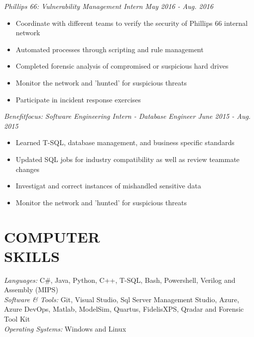 \documentclass[line,margin]{res}
\begin{document}
\begin{resume}
                 {\sl Phillips 66: Vulnerability Management Intern
                   \hfill        May 2016 - Aug. 2016}
                  \begin{itemize}
                  \item Coordinate with different teams to verify the security of
                    Phillips 66 internal network
                  \item Automated processes through scripting and rule management
                  \item Completed forensic analysis of compromised or suspicious
                    hard drives
                  \item Monitor the network and 'hunted' for suspicious threats
                  \item Participate in incident response exercises 
                  \end{itemize}

                  {\sl Benefitfocus: Software Engineering Intern - Database Engineer
                    \hfill        June 2015 - Aug. 2015}
                  \begin{itemize}
                  \item Learned T-SQL, database management, and business specific
                    standards
                  \item Updated SQL jobs for industry compatibility as well as review
                    teammate changes
                  \item Investigat and correct instances of mishandled sensitive data
                  \item Monitor the network and 'hunted' for suspicious threats
                  \end{itemize}

\section{COMPUTER \\ SKILLS} {\sl Languages:} 
                C\#, Java, Python, C++, T-SQL, Bash, Powershell, Verilog and  Assembly (MIPS) \\
                {\sl Software \& Tools:}
                Git, Visual Studio, Sql Server Management Studio, Azure, Azure DevOps,
                Matlab, ModelSim, Quartus, FidelisXPS, Qradar and Forensic Tool Kit \\
                {\sl Operating Systems:} Windows and Linux
 

\end{resume}
\end{document}
